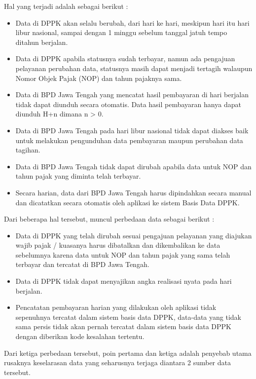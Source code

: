 \documentclass[pdftex, 12pt, oneside]{article}
\begin{document}
Hal yang terjadi adalah sebagai berikut :

\begin{itemize}
\item Data di DPPK akan selalu berubah, dari hari ke hari, meskipun hari itu hari libur nasional, sampai dengan 1 minggu sebelum tanggal jatuh tempo ditahun berjalan.
\item Data di DPPK apabila statusnya sudah terbayar, namun ada pengajuan pelayanan perubahan data, statusnya masih dapat menjadi tertagih walaupun Nomor Objek Pajak (NOP) dan tahun pajaknya sama.
\item Data di BPD Jawa Tengah yang mencatat hasil pembayaran di hari berjalan tidak dapat diunduh secara otomatis. Data hasil pembayaran hanya dapat diunduh H+n dimana n > 0.
\item Data di BPD Jawa Tengah pada hari libur nasional tidak dapat diakses baik untuk melakukan pengunduhan data pembayaran maupun perubahan data tagihan.
\item Data di BPD Jawa Tengah tidak dapat dirubah apabila data untuk NOP dan tahun pajak yang diminta telah terbayar.
\item Secara harian, data dari BPD Jawa Tengah harus dipindahkan secara manual dan dicatatkan secara otomatis oleh aplikasi ke sistem Basis Data DPPK. 
\end{itemize}

Dari beberapa hal tersebut, muncul perbedaan data sebagai berikut :

\begin{itemize}
\item Data di DPPK yang telah dirubah sesuai pengajuan pelayanan yang diajukan wajib pajak / kuasanya harus dibatalkan dan dikembalikan ke data sebelumnya karena data untuk NOP dan tahun pajak yang sama telah terbayar dan tercatat di BPD Jawa Tengah.
\item Data di DPPK tidak dapat menyajikan angka realisasi nyata pada hari berjalan.
\item Pencatatan pembayaran harian yang dilakukan oleh aplikasi tidak sepenuhnya tercatat dalam sistem basis data DPPK, data-data yang tidak sama persis tidak akan pernah tercatat dalam sistem basis data DPPK dengan diberikan kode kesalahan tertentu.
\end{itemize}

Dari ketiga perbedaan tersebut, poin pertama dan ketiga adalah penyebab utama rusaknya keselarasan data yang seharusnya terjaga diantara 2 sumber data tersebut.
\end{document}
